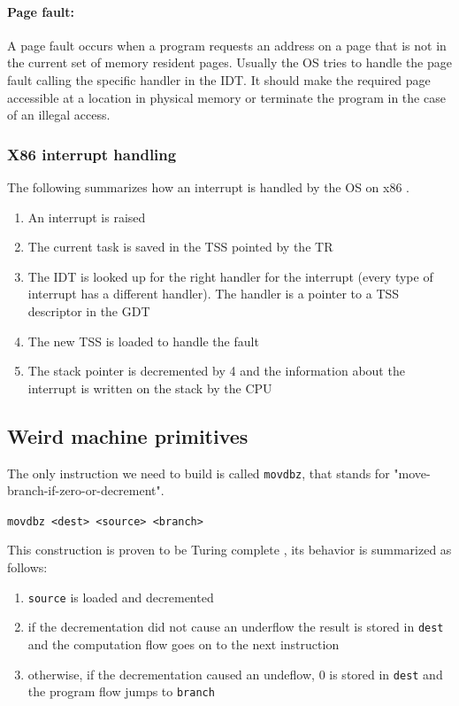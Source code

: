 \documentclass[11pt,twoside,a4paper]{article}
\begin{document}
\paragraph{Page fault: } A page fault occurs when a program requests an address on a page that is not in the current set of memory resident pages. Usually the OS tries to handle the page fault calling the specific handler in the IDT. It should make the required page accessible at a location in physical memory or terminate the program in the case of an illegal access.


\subsubsection{X86 interrupt handling}

The following summarizes how an interrupt is handled by the OS on x86 \cite{intel}.

\begin{enumerate}
\item An interrupt is raised
\item The current task is saved in the TSS pointed by the TR
\item The IDT is looked up for the right handler for the interrupt (every type of interrupt has a different handler). The handler is a pointer to a TSS descriptor in the GDT
\item The new TSS is loaded to handle the fault
\item The stack pointer is decremented by 4 and the information about the interrupt is written on the stack by the CPU
\end{enumerate}

\subsection{Weird machine primitives}

The only instruction we need to build is called \texttt{movdbz}, that stands for "move-branch-if-zero-or-decrement".

\texttt{movdbz <dest> <source> <branch>}

This construction is proven to be Turing complete \cite{mmu_machine}, its behavior is summarized as follows:
\begin{enumerate}
\item \texttt{source} is loaded and decremented
\item if the decrementation did not cause an underflow the result is stored in \texttt{dest} and the computation flow goes on to the next instruction
\item otherwise, if the decrementation caused an undeflow, 0 is stored in \texttt{dest} and the program flow jumps to \texttt{branch}
\end{enumerate}
\end{document}
